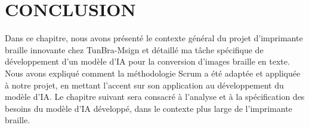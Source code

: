 \section{CONCLUSION}
Dans ce chapitre, nous avons présenté le contexte général du projet d'imprimante braille innovante chez TunBra-Msign et détaillé ma tâche spécifique de développement d'un modèle d'IA pour la conversion d'images braille en texte. Nous avons expliqué comment la méthodologie Scrum a été adaptée et appliquée à notre projet, en mettant l'accent sur son application au développement du modèle d'IA. Le chapitre suivant sera consacré à l'analyse et à la spécification des besoins du modèle d'IA développé, dans le contexte plus large de l'imprimante braille. 